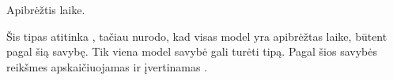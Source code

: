 \documentclass[letterpaper,10pt,lithuanian]{sphinxmanual}
\begin{document}
\begin{fulllineitems}

\pysigstartsignatures
\pysigline
{}
\pysigstopsignatures
\sphinxAtStartPar
{}

\sphinxAtStartPar
Apibrėžtis laike.

\sphinxAtStartPar
Šis tipas atitinka , tačiau nurodo, kad visas model yra
apibrėžtas laike, būtent pagal šią savybę. Tik viena model savybė gali
turėti  tipą. Pagal šios savybės reikšmes apskaičiuojamas ir
įvertinamas .

\end{fulllineitems}

\end{document}
